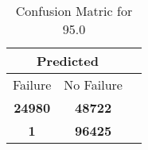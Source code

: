 \begin{table}[] 
\caption{Confusion Matric for 95.0} 
\label{Table: Prediction Accuracy-DMD95.0OnlySunEKF-ignoreReflection200.9EKF-top2-Reflection} 
\centering 
\begin{tabular} 
 {@{}ccc@{}} 
\toprule 
\multicolumn{2}{c}{\textbf{Predicted}}
 \\ \midrule 
\multicolumn{1}{|c|}{Failure} & 
\multicolumn{1}{c|}{No Failure}
 \\ \midrule 
\multicolumn{1}{|c|}{\color{green}\textbf{24980}} & 
\multicolumn{1}{c|}{\color{red}\textbf{48722}}
 \\ \midrule 
\multicolumn{1}{|c|}{\color{red}\textbf{1}} & 
\multicolumn{1}{c|}{\color{green}\textbf{96425}}
 \\ \bottomrule 
\end{tabular} 
\end{table} 
